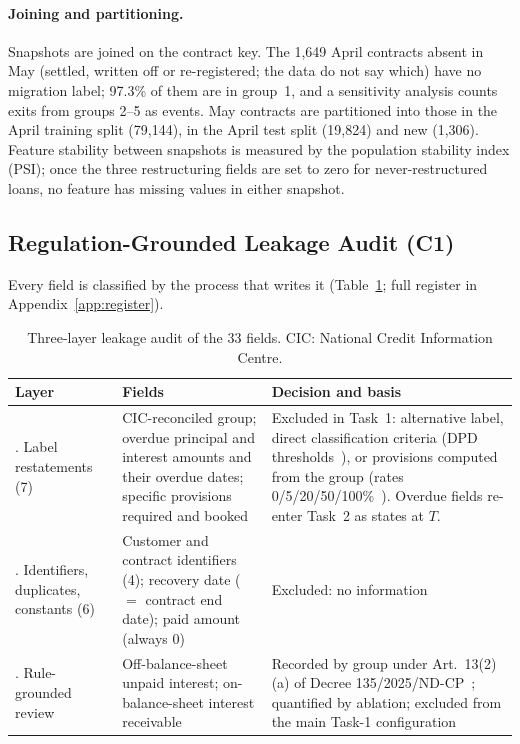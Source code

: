 \documentclass[runningheads]{llncs}
\begin{document}
\paragraph{Joining and partitioning.} Snapshots are joined on the contract key. The 1,649 April contracts absent in May (settled, written off or re-registered; the data do not say which) have no migration label; 97.3\% of them are in group~1, and a sensitivity analysis counts exits from groups 2--5 as events. May contracts are partitioned into those in the April training split (79,144), in the April test split (19,824) and new (1,306). Feature stability between snapshots is measured by the population stability index (PSI); once the three restructuring fields are set to zero for never-restructured loans, no feature has missing values in either snapshot.

\subsection{Regulation-Grounded Leakage Audit (C1)}
\label{sec:leak}

Every field is classified by the process that writes it (Table~\ref{tab:audit}; full register in Appendix~\ref{app:register}).

\begin{table}[t]
\centering
\caption{Three-layer leakage audit of the 33 fields. CIC: National Credit Information Centre.}
\label{tab:audit}
\scriptsize
\begin{tabular}{@{}>{\raggedright\arraybackslash}p{1.9cm}>{\raggedright\arraybackslash}p{4.3cm}>{\raggedright\arraybackslash}p{5.4cm}@{}}
\toprule
Layer & Fields & Decision and basis\\
\midrule
1. Label restatements (7) & CIC-reconciled group; overdue principal and interest amounts and their overdue dates; specific provisions required and booked & Excluded in Task~1: alternative label, direct classification criteria (DPD thresholds~\cite{sbv2024tt31}), or provisions computed from the group (rates 0/5/20/50/100\%~\cite{gov2024nd86}). Overdue fields re-enter Task~2 as states at $T$.\\
2. Identifiers, duplicates, constants (6) & Customer and contract identifiers (4); recovery date ($=$ contract end date); paid amount (always 0) & Excluded: no information\\
3. Rule-grounded review & Off-balance-sheet unpaid interest; on-balance-sheet interest receivable & Recorded by group under Art.~13(2)(a) of Decree 135/2025/ND-CP~\cite{gov2025nd135}; quantified by ablation; excluded from the main Task-1 configuration\\
\bottomrule
\end{tabular}
\end{table}
\end{document}
